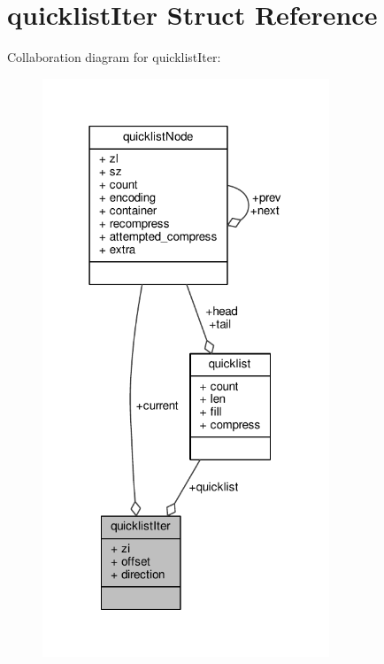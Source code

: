 \hypertarget{structquicklistIter}{}\section{quicklist\+Iter Struct Reference}
\label{structquicklistIter}


Collaboration diagram for quicklist\+Iter\+:\nopagebreak
\begin{figure}[H]
\begin{center}
\leavevmode
\includegraphics[width=243pt]{structquicklistIter__coll__graph}
\end{center}
\end{figure}
